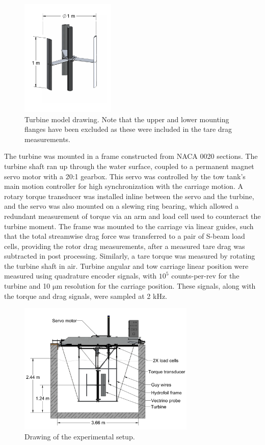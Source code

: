 \documentclass[energies,article,accept,moreauthors,pdftex,12pt,a4paper]{mdpi}
\begin{document}
\begin{figure}[ht!]
\centering
\includegraphics[width=0.4\textwidth]{figures/turbine}
\caption{Turbine model drawing. Note that the upper and lower mounting
flanges have been excluded as these were included in the tare drag
measurements.} 
\label{fig:turbine}
\end{figure}


The turbine was mounted in a frame constructed from NACA 0020 sections. The
turbine shaft ran up through the water surface, coupled to a permanent magnet
servo motor with a 20:1 gearbox. This servo was controlled by the tow tank's
main motion controller for high synchronization with the carriage motion. A
rotary torque transducer was installed inline between the servo and the turbine,
and the servo was also mounted on a slewing ring bearing, which allowed a
redundant measurement of torque via an arm and load cell used to counteract the
turbine moment. The frame was mounted to the carriage via linear guides, such
that the total streamwise drag force was transferred to a pair of S-beam load
cells, providing the rotor drag measurements, after a measured tare drag was
subtracted in post processing. Similarly, a tare torque was measured by rotating
the turbine shaft in air. Turbine angular and tow carriage linear position were
measured using quadrature encoder signals, with $10^5$ counts-per-rev for the
turbine and 10 $\mathrm{\mu m}$ resolution for the carriage position. These
signals, along with the torque and drag signals, were sampled at 2 kHz.

\begin{figure}[ht!]
\centering
\includegraphics[width=0.75\textwidth]{figures/exp_setup_drawing}
\caption{Drawing of the experimental setup.}
\label{fig:exp-setup}
\end{figure}
\end{document}
